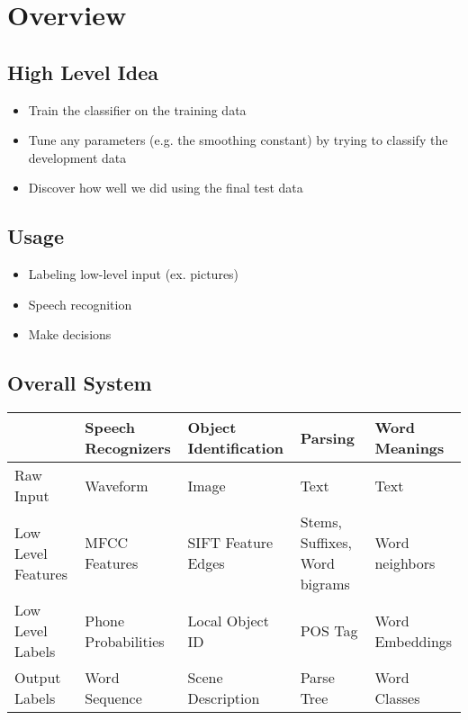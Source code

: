 \section{Overview}

  \subsection{High Level Idea}

    \begin{itemize}
      \item Train the classifier on the training data
      \item Tune any parameters (e.g. the smoothing constant)
      by trying to classify the development data
      \item Discover how well we did using the final test data
    \end{itemize}

  \subsection{Usage}

    \begin{itemize}
      \item Labeling low-level input (ex. pictures)
      \item Speech recognition
      \item Make decisions
    \end{itemize}

  \subsection{Overall System}

    \begin{tabu} to \columnwidth{ | X[1, l] | X[1, l] | X[1, l] | X[1, l] | X[1, l] | }
      \hline
      & Speech Recognizers & Object Identification & Parsing & Word Meanings \\ \hline
      Raw Input & Waveform & Image & Text & Text \\ \hline
      Low Level Features & MFCC Features & SIFT Feature Edges & Stems, Suffixes, Word bigrams & Word neighbors \\ \hline
      Low Level Labels & Phone Probabilities & Local Object ID & POS Tag & Word Embeddings \\ \hline
      Output Labels & Word Sequence & Scene Description & Parse Tree & Word Classes \\ \hline
    \end{tabu}

